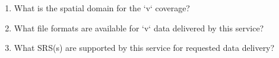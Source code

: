 \documentclass[]{article}
\providecommand{\tightlist}{%
  \setlength{\itemsep}{0pt}\setlength{\parskip}{0pt}}
\begin{document}
\begin{enumerate}
  \begin{enumerate}
  \def\labelenumii{\alph{enumii}.}
  \tightlist
  \item
    What is the spatial domain for the `v` coverage?
  \item
    What file formats are available for `v` data delivered by this
    service?
  \item
    What SRS(s) are supported by this service for requested data
    delivery?
  \end{enumerate}
\end{enumerate}
\end{document}
